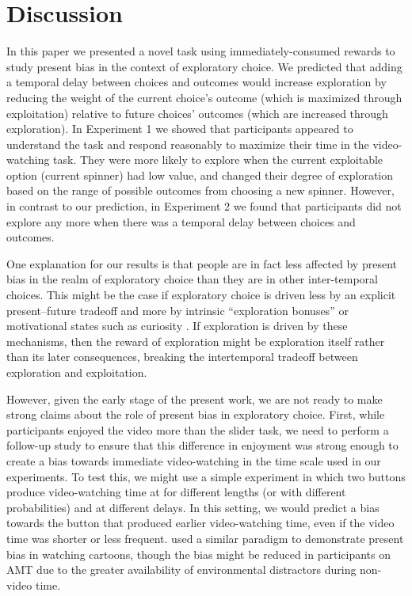 \documentclass[10pt,letterpaper]{article}
\begin{document}
\section{Discussion}

In this paper we presented a novel task using immediately-consumed rewards
to study present bias in the context of exploratory choice. We predicted that
adding a temporal delay between choices and outcomes would increase exploration
by reducing the weight of the current choice's outcome (which is maximized
through exploitation) relative to future choices' outcomes (which are increased
through exploration). In
Experiment 1 we showed that participants appeared to understand the task and
respond reasonably to maximize their time in the video-watching task. They were
more likely to explore when the current exploitable option (current spinner) had
low value, and changed their degree of exploration based on the range of possible
outcomes from choosing a new spinner. However, in contrast to our prediction, in Experiment 2 we found that
participants did not explore any more when there was a temporal delay between
choices and outcomes.

One explanation for our results is that people are in fact less affected by
present bias in the realm of exploratory choice than they are in other
inter-temporal choices. This might be the case if exploratory choice is driven
less by an explicit present--future tradeoff and more by intrinsic ``exploration
bonuses'' \citep{kakade2002dopamine} or motivational states such as curiosity
\citep{Berlyne1966}. If exploration is driven by these mechanisms, then the
reward of exploration might be exploration itself rather than its later
consequences, breaking the intertemporal tradeoff between exploration and
exploitation.

However, given the early stage of the present work, we are not ready to make
strong claims about the role of present bias in exploratory choice. First, while
participants enjoyed the video more than the slider task, we need to perform a
follow-up study to ensure that this difference in enjoyment was strong enough to
create a bias towards immediate video-watching in the time scale used in our
experiments. To test this, we might use a simple 
experiment in which two buttons produce video-watching time at for different
lengths (or with different probabilities) and at different delays. In this
setting, we would predict a bias towards the button that produced earlier
video-watching time, even if the video time was shorter or less frequent.
\citet{Navarick1998} used a similar paradigm to demonstrate present bias in
watching cartoons, though the bias might be reduced in participants on AMT due
to the greater availability of environmental distractors during non-video time.
\end{document}
